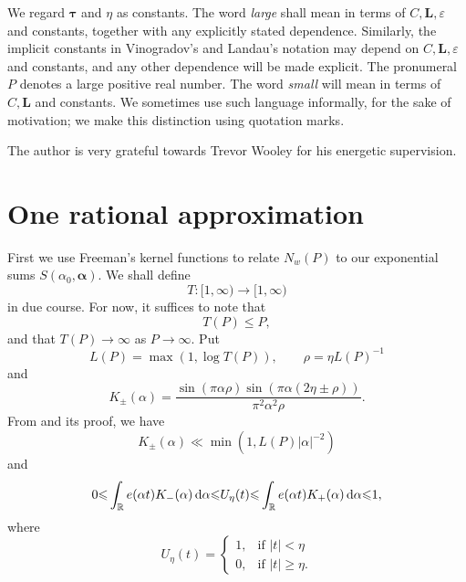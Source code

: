 \documentclass[12pt,reqno]{amsart}
\theoremstyle{definition}
\theoremstyle{remark}
\numberwithin{equation}{section}
\begin{document}
We regard ${\boldsymbol{\tau}}$ and $\eta$ as constants. The word \emph{large} shall mean in terms of $C, {\mathbf L}, {\varepsilon}$ and constants, together with any explicitly stated dependence. Similarly, the implicit constants in Vinogradov's and Landau's notation may depend on $C, {\mathbf L}, {\varepsilon}$ and constants, and any other dependence will be made explicit. The pronumeral $P$ denotes a large positive real number. The word \emph{small} will mean in terms of $C, {\mathbf L}$ and constants. We sometimes use such language informally, for the sake of motivation; we make this distinction using quotation marks. 

The author is very grateful towards Trevor Wooley for his energetic supervision.

\section{One rational approximation}
\label{OneRational}

First we use Freeman's kernel functions \cite[\S 2.1]{Fre2002} to relate $N_w(P)$ to our exponential sums $S({{\alpha}}_0,{\boldsymbol{{\alpha}}})$. We shall define 
\[
T: [1, \infty) \to [1, \infty)
\]
in due course. For now, it suffices to note that 
\begin{equation} \label{Tbound}
T(P) {\leqslant} P, 
\end{equation}
and that $T(P) \to \infty$ as $P \to \infty$. Put
\begin{equation} \label{Ldef}
L(P) = \max(1,\log T(P)), \qquad \rho = \eta L(P)^{-1}
\end{equation}
and
\begin{equation} \label{Kdef}
K_{\pm}({{\alpha}}) = \frac {\sin(\pi {{\alpha}} \rho) \sin(\pi {{\alpha}}(2 \eta \pm \rho))} {\pi^2 {{\alpha}}^2 \rho}. 
\end{equation}
From \cite[Lemma 1]{Fre2002} and its proof, we have
\begin{equation} \label{Kbounds}
K_\pm({{\alpha}}) \ll \min(1, L(P) |{{\alpha}}|^{-2})
\end{equation}
and
\begin{equation} \label{Ubounds}
0 {\leqslant} \int_{\mathbb R} e({{\alpha}} t) K_{-}({{\alpha}}){{\,{\rm d}}}{{\alpha}} {\leqslant} U_\eta(t) {\leqslant} \int_{\mathbb R} e({{\alpha}} t) K_{+}({{\alpha}}){{\,{\rm d}}}{{\alpha}} {\leqslant} 1,
\end{equation}
where
\begin{equation*}
U_\eta(t) = 
\begin{cases}
1, &\text{if } |t| < \eta \\
0, &\text{if } |t| {\geqslant} \eta.
\end{cases}
\end{equation*}
\end{document}
